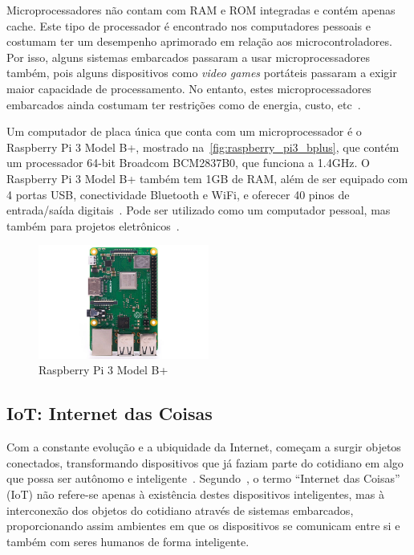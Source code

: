 Microprocessadores não contam com RAM e ROM integradas e contém apenas cache. Este tipo de processador é encontrado nos computadores pessoais e costumam ter um desempenho aprimorado em relação aos microcontroladores. Por isso, alguns sistemas embarcados passaram a usar microprocessadores também, pois alguns dispositivos como \textit{video games} portáteis passaram a exigir maior capacidade de processamento. No entanto, estes microprocessadores embarcados ainda costumam ter restrições como de energia, custo, etc~\cite{schlett:1998}.

Um computador de placa única que conta com um microprocessador é o Raspberry Pi 3 Model B+, mostrado na~\autoref{fig:raspberry_pi3_bplus}, que contém um processador 64-bit Broadcom BCM2837B0, que funciona a 1.4GHz. O Raspberry Pi 3 Model B+ também tem 1GB de RAM, além de ser equipado com 4 portas USB, conectividade Bluetooth e WiFi, e oferecer 40 pinos de entrada/saída digitais~\cite{raspberry:pi3_store}. Pode ser utilizado como um computador pessoal, mas também para projetos eletrônicos~\cite{raspberry:faq}.

\begin{figure}[ht]
	\caption{\label{fig:raspberry_pi3_bplus}Raspberry Pi 3 Model B+}
	\begin{center}
	    \includegraphics[width=0.5\textwidth]{resources/raspberry_pi3_bplus}
	\end{center}
\end{figure}

\subsection{IoT\@: Internet das Coisas}
Com a constante evolução e a ubiquidade da Internet, começam a surgir objetos conectados, transformando dispositivos que já faziam parte do cotidiano em algo que possa ser autônomo e inteligente~\cite{kopetz:2011}.  Segundo~, o termo ``Internet das Coisas'' (IoT)  não refere-se apenas à existência destes dispositivos inteligentes, mas à interconexão dos objetos do cotidiano através de sistemas embarcados, proporcionando assim ambientes em que os dispositivos se comunicam entre si e também com seres humanos de forma inteligente.

